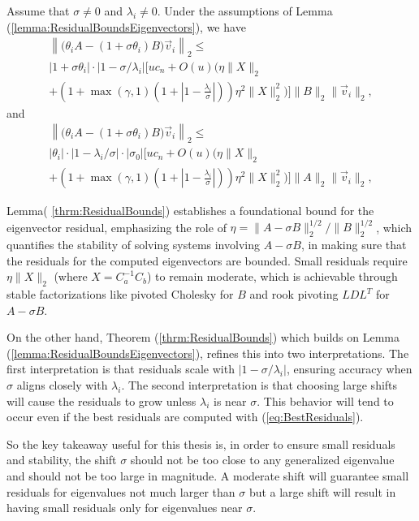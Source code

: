 \begin{theorem}\label{thrm:ResidualBounds}
	Assume that $\sigma\neq 0$ and $\lambda_i\neq 0$.  Under the assumptions of Lemma (\ref{lemma:ResidualBoundsEigenvectors}), we have
	\begin{multline*}
		\left\| \big(\theta_i A - (1+\sigma \theta_i) B\big) \vec{v}_i \right\|_2
		\leq \\
		|1+\sigma \theta_i| \cdot |1-\sigma/\lambda_i| \Bigg[
		uc_n +O(u)\Bigg( \eta\|X\|_2 \\
		+ \left(1 + \max(\gamma, 1)
		\left(1+ \left| 1 - \frac{\lambda_i}{\sigma}\right|\right)\right)
		\eta^2\|X\|_2^2 \Bigg) \Bigg] \|B\|_2 \|\vec{v}_i\|_2,
	\end{multline*}
	and
	\begin{multline*}
		\left\| \big(\theta_i A - (1+\sigma \theta_i) B\big) \vec{v}_i \right\|_2
		\leq \\
		|\theta_i| \cdot |1-\lambda_i/\sigma| \cdot |\sigma_0| \Bigg[
		uc_n +O(u)\Bigg( \eta\|X\|_2 \\
		+ \left(1 + \max(\gamma, 1) \left(1+ \left| 1
		- \frac{\lambda_i}{\sigma}\right|\right)\right)
		\eta^2\|X\|_2^2 \Bigg) \Bigg] \|A\|_2 \|\vec{v}_i\|_2,
	\end{multline*}
\end{theorem}

Lemma( \ref{thrm:ResidualBounds}) establishes a foundational bound for the eigenvector residual, emphasizing the role of $\eta = \|A - \sigma B\|_2^{1/2}/\|B\|_2^{1/2} $, which quantifies the stability of solving systems involving $A-\sigma B$, in making sure that the residuals for the computed eigenvectors are bounded. Small residuals require $\eta \|X\|_2$ (where $X = C_a^{-1}C_b$) to remain moderate, which is achievable through stable factorizations like pivoted Cholesky for $B$ and rook pivoting $LDL^T$ for $A-\sigma B$.

On the other hand, Theorem (\ref{thrm:ResidualBounds}) which builds on Lemma (\ref{lemma:ResidualBoundsEigenvectors}), refines this into two interpretations. The first interpretation is that residuals scale with $\lvert 1 - \sigma/ \lambda_i \rvert$, ensuring accuracy when $\sigma$ aligns closely with $\lambda_i$. The second interpretation is that choosing large shifts will cause the residuals to grow unless $\lambda_i$ is near $\sigma$. This behavior will tend to occur even if the best residuals are computed with (\ref{eq:BestResiduals}).

So the key takeaway useful for this thesis is, in order to ensure small residuals and stability, the shift $\sigma$ should not be too close to any generalized eigenvalue and should not be too large in magnitude. A moderate shift will guarantee small residuals for eigenvalues not much larger than $\sigma$ but a large shift will result in having small residuals only for eigenvalues near $\sigma$.
